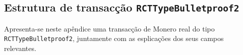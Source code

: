 \begin{appendices}

\renewcommand{\theFancyVerbLine}{%
	\textcolor{red}{\small
		\arabic{FancyVerbLine}}}

\chapter{Estrutura de transacção {\tt RCTTypeBulletproof2}}
\label{appendix:RCTTypeBulletproof2}

Apresenta-se neste apêndice uma transacção de Monero real do tipo {\tt RCTTypeBulletproof2}, juntamente com as esplicações dos seus campos relevantes.


\end{appendices}
